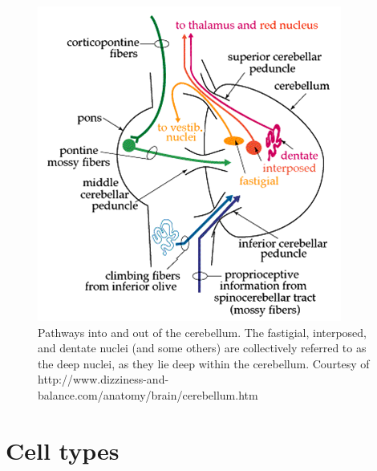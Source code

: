 \documentclass{article}
\theoremstyle{definition}
\begin{document}
\begin{figure}
\includegraphics[width=\linewidth]{nanohub/pathways.png}
\caption{Pathways into and out of the cerebellum. The fastigial,
  interposed, and dentate nuclei (and some others) are collectively
  referred to as the deep nuclei, as they lie deep within the
  cerebellum. Courtesy of
  http://www.dizziness-and-balance.com/anatomy/brain/cerebellum.htm}
\label{fig-pathways}
\end{figure}


\section{Cell types}
\end{document}
